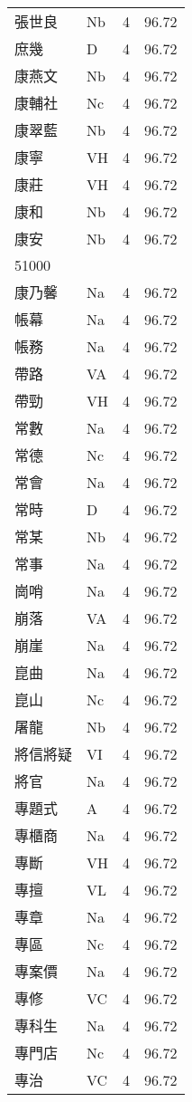 \documentclass[twocolumn]{book}
\begin{document}
\begin{supertabular}{llrr}
張世良 & Nb & 4 &  96.72\\
庶幾 & D & 4 &  96.72\\
康燕文 & Nb & 4 &  96.72\\
康輔社 & Nc & 4 &  96.72\\
康翠藍 & Nb & 4 &  96.72\\
康寧 & VH & 4 &  96.72\\
康莊 & VH & 4 &  96.72\\
康和 & Nb & 4 &  96.72\\
康安 & Nb & 4 &  96.72\\
51000\\
康乃馨 & Na & 4 &  96.72\\
帳幕 & Na & 4 &  96.72\\
帳務 & Na & 4 &  96.72\\
帶路 & VA & 4 &  96.72\\
帶勁 & VH & 4 &  96.72\\
常數 & Na & 4 &  96.72\\
常德 & Nc & 4 &  96.72\\
常會 & Na & 4 &  96.72\\
常時 & D & 4 &  96.72\\
常某 & Nb & 4 &  96.72\\
常事 & Na & 4 &  96.72\\
崗哨 & Na & 4 &  96.72\\
崩落 & VA & 4 &  96.72\\
崩崖 & Na & 4 &  96.72\\
崑曲 & Na & 4 &  96.72\\
崑山 & Nc & 4 &  96.72\\
屠龍 & Nb & 4 &  96.72\\
將信將疑 & VI & 4 &  96.72\\
將官 & Na & 4 &  96.72\\
專題式 & A & 4 &  96.72\\
專櫃商 & Na & 4 &  96.72\\
專斷 & VH & 4 &  96.72\\
專擅 & VL & 4 &  96.72\\
專章 & Na & 4 &  96.72\\
專區 & Nc & 4 &  96.72\\
專案價 & Na & 4 &  96.72\\
專修 & VC & 4 &  96.72\\
專科生 & Na & 4 &  96.72\\
專門店 & Nc & 4 &  96.72\\
專治 & VC & 4 &  96.72\\

\end{supertabular}
\end{document}
